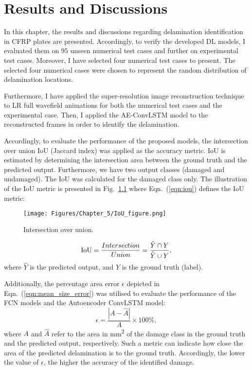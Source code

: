 \chapter[Results and Discussions]{Results and Discussions}
\label{ch5}

In this chapter, the results and discussions regarding delamination identification in CFRP plates are presented. 
Accordingly, to verify the developed DL models, I evaluated them on \(95\) unseen numerical test cases and further on experimental test cases.
Moreover, I have selected four numerical test cases to present. 
The selected four numerical cases were chosen to represent the random distribution of delamination locations.

Furthermore, I have applied the super-resolution image reconstruction technique to LR full wavefield animations for both the numerical test cases and the experimental case. 
Then, I applied the AE-ConvLSTM model to the reconstructed frames in order to identify the delamination.

Accordingly, to evaluate the performance of the proposed models, the intersection over union IoU (Jaccard index) was applied as the accuracy metric.
IoU is estimated by determining the intersection area between the ground truth and the predicted output.
Furthermore, we have two output classes (damaged and undamaged). 
The IoU was calculated for the damaged class only.
The illustration of the IoU metric is presented in Fig.~\ref{fig:iou} where Eqn.~(\ref{eqn:iou}) defines the IoU metric:
\begin{figure} [h!]
	\begin{center}
		\texttt{[image: Figures/Chapter\_5/IoU\_figure.png]}
	\end{center}
	\caption{Intersection over union.} 
	\label{fig:iou}
\end{figure}
\begin{equation}
	\textup{IoU}=\frac{Intersection}{Union}=\frac{\hat{Y} \cap Y}{\hat{Y} \cup Y},
	\label{eqn:iou}
\end{equation}
where \(\hat{Y}\) is the predicted output, and \(Y\) is the ground truth (label).

Additionally, the percentage area error $\epsilon$ depicted in Eqn.~(\ref{eqn:mean_size_error}) was utilised to evaluate the performance of the FCN models and the Autoencoder ConvLSTM model:
\begin{equation}
	\epsilon=\frac{|A-\hat{A}|}{A} \times 100\%,
	\label{eqn:mean_size_error}
\end{equation}
where \(A\) and \(\hat{A}\) refer to the area in mm\textsuperscript{2} of the damage class in the ground truth and the predicted output, respectively.
Such a metric can indicate how close the area of the predicted delamination is to the ground truth.
Accordingly, the lower the value of $\epsilon$, the higher the accuracy of the identified damage. 

